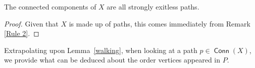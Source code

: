 \documentclass{article}
\DeclareMathOperator{\Conn}{\bm{\mathsf{Conn}}}
\newcommand{\dc}[1]{}%
\begin{document}
\begin{cor} \label{exitless rule} The connected components of $X$\dc{ I would replace all instances of $X$ around this lemma with $F(P)$, or else state explicitly that $X$ now always refers to $F(P)$, preferably still changing the symbol because you use $X$ to mean something different in previous sections.} are all strongly exitless paths. 

\begin{proof} Given that $X$ is made up of paths, this comes immediately from Remark \ref{Rule 2}.\end{proof} 
\end{cor}

Extrapolating upon Lemma~\ref{walking}, when looking at a path $p \in \Conn(X)$, we provide what can be deduced about the order vertices appeared in $P$.   
\end{document}
